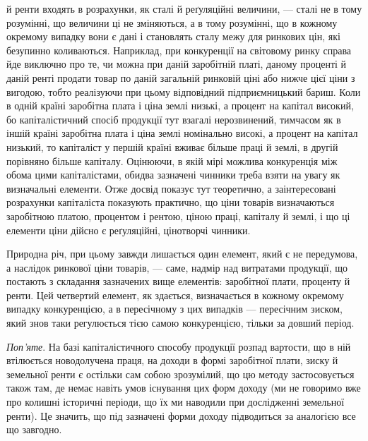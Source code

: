 \parcont{} %
й ренти входять в розрахунки, як сталі й реґуляційні величини, — сталі не в тому
розумінні, що величини ці не зміняються, а в тому розумінні, що в кожному окремому
випадку вони є дані і становлять сталу межу для ринкових цін, які безупинно
коливаються. Наприклад, при конкуренції на світовому ринку справа
йде виключно про те, чи можна при даній заробітній платі, даному проценті й
даній ренті продати товар по даній загальній ринковій ціні або нижче цієї ціни
з вигодою, тобто реалізуючи при цьому відповідний підприємницький бариш.
Коли в одній країні заробітна плата і ціна землі низькі, а процент на капітал
високий, бо капіталістичний спосіб продукції тут взагалі нерозвинений,
тимчасом як в іншій країні заробітна плата і ціна землі номінально високі, а
процент на капітал низький, то капіталіст у першій країні вживає більше праці
й землі, в другій порівняно більше капіталу. Оцінюючи, в якій мірі можлива
конкуренція між обома цими капіталістами, обидва зазначені чинники треба
взяти на увагу як визначальні елементи. Отже досвід показує тут теоретично, а
заінтересовані розрахунки капіталіста показують практично, що ціни товарів
визначаються заробітною платою, процентом і рентою, ціною праці, капіталу
й землі, і що ці елементи ціни дійсно є реґуляційні, цінотворчі чинники.

Природна річ, при цьому завжди лишається один елемент, який є не
передумова, а наслідок ринкової ціни товарів, — саме, надмір над витратами продукції, що постають з
складання зазначених вище елементів: заробітної плати,
проценту й ренти. Цей четвертий елемент, як здається, визначається в кожному
окремому випадку конкуренцією, а в пересічному з цих випадків — пересічним
зиском, який знов таки регулюється тією самою конкуренцією, тільки за довший
період.

\emph{Поп’яте}. На базі капіталістичного способу продукції розпад вартости, що
в ній втілюється новодолучена праця, на доходи в формі заробітної плати, зиску
й земельної ренти є остільки сам собою зрозумілий, що цю методу застосовується
також там, де немає навіть умов існування цих форм доходу (ми не говоримо
вже про колишні історичні періоди, що їх ми наводили при дослідженні
земельної ренти). Це значить, що під зазначені форми доходу підводиться за
аналогією все що завгодно.

